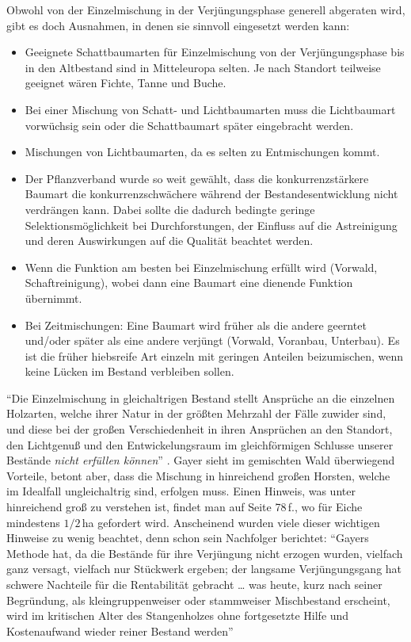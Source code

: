 \documentclass[twocolumn, paper=a4, fontsize=10pt, bibliography=totoc, index=totoc]{scrartcl}
\begin{document}
Obwohl von der Einzelmischung in der Verjüngungsphase generell
abgeraten wird, gibt es doch Ausnahmen, in denen sie sinnvoll
eingesetzt werden kann:
\begin{itemize}
\item Geeignete Schattbaumarten für Einzelmischung von der
  Verjüngungsphase bis in den Altbestand sind in Mitteleuropa
  selten. Je nach Standort teilweise geeignet wären Fichte, Tanne und
  Buche.
\item Bei einer Mischung von Schatt- und Lichtbaumarten muss die
  Lichtbaumart vorwüchsig sein oder die Schattbaumart später
  eingebracht werden.
\item Mischungen von Lichtbaumarten, da es selten zu Entmischungen
  kommt.
\item Der Pflanzverband wurde so weit gewählt, dass die
  konkurrenzstärkere Baumart die konkurrenzschwächere während der
  Bestandesentwicklung nicht verdrängen kann. Dabei sollte die
  dadurch bedingte geringe Selektionsmöglichkeit bei Durchforstungen,
  der Einfluss auf die Astreinigung und deren Auswirkungen auf die
  Qualität beachtet werden.
\item Wenn die Funktion am besten bei Einzelmischung erfüllt wird
  (Vorwald, Schaftreinigung), wobei dann eine Baumart eine dienende
  Funktion übernimmt.
\item Bei Zeitmischungen: Eine Baumart wird früher als die andere
  geerntet und/oder später als eine andere verjüngt (Vorwald,
  Voranbau, Unterbau). Es ist die früher hiebsreife Art einzeln mit
  geringen Anteilen beizumischen, wenn keine Lücken im Bestand
  verbleiben sollen.
\end{itemize}
\enquote{Die Einzelmischung in gleichaltrigen Bestand stellt Ansprüche an
die einzelnen Holzarten, welche ihrer Natur in der größten Mehrzahl
der Fälle zuwider sind, und diese bei der großen Verschiedenheit in
ihren Ansprüchen an den Standort, den Lichtgenuß und den
Entwickelungsraum im gleichförmigen Schlusse unserer Bestände \emph{nicht erfüllen können}}
\citep[S.~147]{gayer1886DerGemischteWald}. Gayer sieht im gemischten
Wald überwiegend Vorteile, betont aber, dass die Mischung in
hinreichend großen Horsten, welche im Idealfall ungleichaltrig sind,
erfolgen muss. Einen Hinweis, was unter hinreichend groß zu verstehen ist,
findet man auf Seite 78\,f., wo für Eiche mindestens $1/2$\,\unit{\hectare} gefordert
wird. Anscheinend wurden viele dieser wichtigen Hinweise zu wenig
beachtet, denn schon sein Nachfolger berichtet: \enquote{Gayers Methode
hat, da die Bestände für ihre Verjüngung nicht erzogen wurden,
vielfach ganz versagt, vielfach nur Stückwerk ergeben; der langsame
Verjüngungsgang hat schwere Nachteile für die Rentabilität gebracht
\dots{} was heute, kurz nach seiner Begründung, als kleingruppenweiser
oder stammweiser Mischbestand erscheint, wird im kritischen Alter des
Stangenholzes ohne fortgesetzte Hilfe und Kostenaufwand wieder reiner
Bestand werden}
\end{document}
